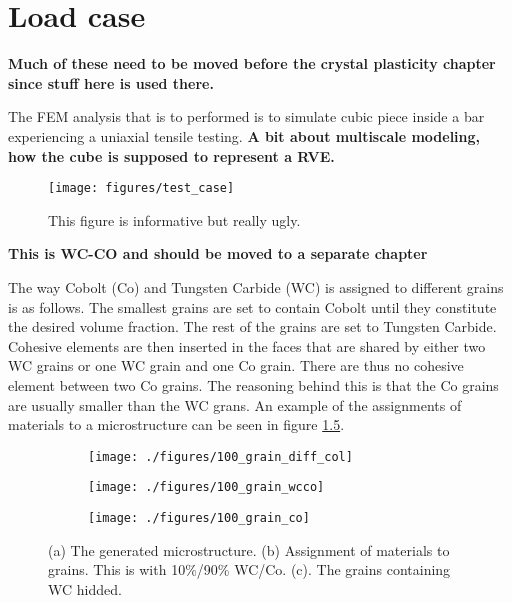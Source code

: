 \documentclass[load_case.tex]{subfiles}
\begin{document}
\chapter{Load case}

\textbf{Much of these need to be moved before the crystal plasticity chapter since stuff here is used there.}

The FEM analysis that is to performed is to simulate cubic piece inside a bar experiencing a uniaxial tensile testing. \textbf{A bit about multiscale modeling, how the cube is supposed to represent a RVE.} 




\begin{figure}[ht]
\centering
\texttt{[image: figures/test\_case]}
\caption{This figure is informative but really ugly.}
\label{fig:test_case}
\end{figure}


\textbf{This is WC-CO and should be moved to a separate chapter}

The way Cobolt (Co) and Tungsten Carbide (WC) is assigned to different grains is as follows. The smallest grains are set to contain Cobolt until they constitute the desired volume fraction. The rest of the grains are set to Tungsten Carbide. Cohesive elements are then inserted in the faces that are shared by either two WC grains or one WC grain and one Co grain. There are thus no cohesive element between two Co grains. The reasoning behind this is that the Co grains are usually smaller than the WC grans.  An example of the assignments of materials to a microstructure can be seen in figure \ref{fig:cowc}.

\begin{figure}
\centering
\begin{subfigure}[b]{.5\textwidth}
  \centering
  \texttt{[image: ./figures/100\_grain\_diff\_col]}
  \caption{}
  \label{fig:cowc_a}
\end{subfigure}%
\hspace{-10mm}
\begin{subfigure}[b]{.5\textwidth}
  \centering
  \texttt{[image: ./figures/100\_grain\_wcco]}
  \caption{}
  \label{fig:cowc_b}
\end{subfigure}%
\hspace{-10mm}
\begin{subfigure}[b]{.5\textwidth}
  \centering
  \texttt{[image: ./figures/100\_grain\_co]}
  \caption{}
  \label{fig:cowc_c}
\end{subfigure}
\caption{(a) The generated microstructure. (b) Assignment of materials to grains. This is with 10\%/90\% WC/Co. (c). The grains containing WC hidded.}
\label{fig:cowc}
\end{figure}
\end{document}
